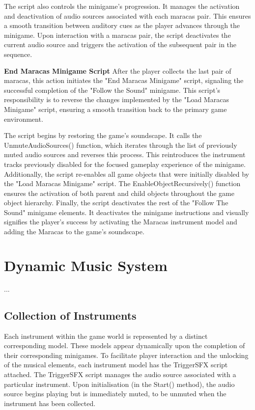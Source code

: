 \documentclass{l4proj}
\begin{document}
The script also controls the minigame's progression. It manages the activation and deactivation of audio sources associated with each maracas pair. This ensures a smooth transition between auditory cues as the player advances through the minigame. Upon interaction with a maracas pair, the script deactivates the current audio source and triggers the activation of the subsequent pair in the sequence.

\textbf{End Maracas Minigame Script} \newline
After the player collects the last pair of maracas, this action initiates the "End Maracas Minigame" script, signaling the successful completion of the "Follow the Sound" minigame. This script's responsibility is to reverse the changes implemented by the "Load Maracas Minigame" script, ensuring a smooth transition back to the primary game environment.

The script begins by restoring the game's soundscape. It calls the UnmuteAudioSources() function, which iterates through the list of previously muted audio sources and reverses this process. This reintroduces the instrument tracks previously disabled for the focused gameplay experience of the minigame. Additionally, the script re-enables all game objects that were initially disabled by the "Load Maracas Minigame" script. The EnableObjectRecursively() function ensures the activation of both parent and child objects throughout the game object hierarchy. Finally, the script deactivates the rest of the "Follow The Sound" minigame elements. It deactivates the minigame instructions and visually signifies the player's success by activating the Maracas instrument model and adding the Maracas to the game's soundscape.

\section{Dynamic Music System}
...

\subsection{Collection of Instruments}
Each instrument within the game world is represented by a distinct corresponding model. These models appear dynamically upon the completion of their corresponding minigames. To facilitate player interaction and the unlocking of the musical elements, each instrument model has the TriggerSFX script attached. The TriggerSFX script manages the audio source associated with a particular instrument. Upon initialisation (in the Start() method), the audio source begins playing but is immediately muted, to be unmuted when the instrument has been collected.
\end{document}
